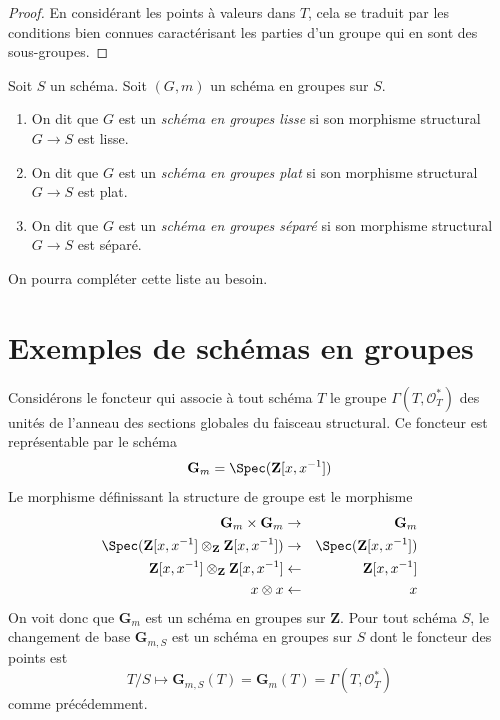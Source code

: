 \begin{proof}
En considérant les points à valeurs dans $T$, cela se traduit par les conditions bien connues
caractérisant les parties d'un groupe qui en sont des sous-groupes.
\end{proof}

\begin{definition}
\label{definition-smooth-group-scheme}
Soit $S$ un schéma. Soit $(G, m)$ un schéma en groupes sur $S$.
\begin{enumerate}
\item On dit que $G$ est un {\it schéma en groupes lisse} si son morphisme
structural $G \to S$ est lisse.
\item On dit que $G$ est un {\it schéma en groupes plat} si son morphisme
structural $G \to S$ est plat.
\item On dit que $G$ est un {\it schéma en groupes séparé} si son morphisme
structural $G \to S$ est séparé.
\end{enumerate}
On pourra compléter cette liste au besoin.
\end{definition}






\section{Exemples de schémas en groupes}
\label{section-examples-group-schemes}

\begin{example}
\label{example-multiplicative-group}
Considérons le foncteur qui associe
à tout schéma $T$ le groupe $\Gamma(T, \mathcal{O}_T^*)$
des unités de l'anneau des sections globales du faisceau structural.
Ce foncteur est représentable par le schéma
$$
\mathbf{G}_m = \Spec(\mathbf{Z}[x, x^{-1}])
$$
Le morphisme définissant la structure de groupe est le morphisme
\begin{eqnarray*}
\mathbf{G}_m \times \mathbf{G}_m & \to & \mathbf{G}_m \\
\Spec(\mathbf{Z}[x, x^{-1}] \otimes_{\mathbf{Z}} \mathbf{Z}[x, x^{-1}])
& \to &
\Spec(\mathbf{Z}[x, x^{-1}]) \\
\mathbf{Z}[x, x^{-1}] \otimes_{\mathbf{Z}} \mathbf{Z}[x, x^{-1}]
& \leftarrow &
\mathbf{Z}[x, x^{-1}] \\
x \otimes x & \leftarrow & x
\end{eqnarray*}
On voit donc que $\mathbf{G}_m$ est un schéma en groupes sur $\mathbf{Z}$.
Pour tout schéma $S$, le changement de base $\mathbf{G}_{m, S}$ est un
schéma en groupes sur $S$ dont le foncteur des points est
$$
T/S
\longmapsto
\mathbf{G}_{m, S}(T) = \mathbf{G}_m(T) = \Gamma(T, \mathcal{O}_T^*)
$$
comme précédemment.
\end{example}

